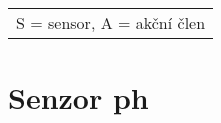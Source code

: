 \begin{table}[h]
\begin{tabular}{|l|l|l|l|l|}
            \end{tabular}
            \begin{tabular}{c}
                S = sensor, A = akční člen \\
            \end{tabular}
   
    \end{table}










\section{Senzor \acs{ph}}
\label{sec:perif-sensor-ph}




